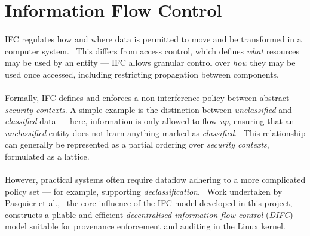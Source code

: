 



\section{Information Flow Control}
\label{sec:ifc}

\paragraph{} IFC regulates how and where data is permitted to move and be transformed in a computer system.~\cite{ifc-data-prop} This differs from access control, which defines \textit{what} resources may be used by an entity --- IFC allows granular control over \textit{how} they may be used once accessed, including restricting propagation between components. 

\paragraph{} Formally, IFC defines and enforces a non-interference policy between abstract \textit{security contexts}. A simple example is the distinction between \textit{unclassified} and \textit{classified} data --- here, information is only allowed to flow \textit{up}, ensuring that an \textit{unclassified} entity does not learn anything marked as \textit{classified}.~\cite{Bell1973SecureCS} This relationship can generally be represented as a partial ordering over \textit{security contexts}, formulated as a lattice.~\cite{ifc-lattice}

\paragraph{} However, practical systems often require dataflow adhering to a more complicated policy set --- for example, supporting \textit{declassification}.~\cite{10.5555/794199.795122} Work undertaken by Pasquier et al.,~\cite{camflow} the core influence of the IFC model developed in this project, constructs a pliable and efficient \textit{decentralised information flow control} (\textit{DIFC}) model suitable for provenance enforcement and auditing in the Linux kernel.

